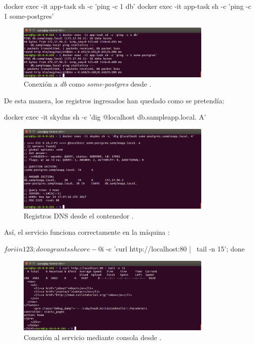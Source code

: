\begin{code}
docker exec -it app-task sh -c 'ping -c 1 db'
docker exec -it app-task sh -c 'ping -c 1 some-postgres'
\end{code}

\begin{figure}[H]
\centering
\includegraphics[width=0.85\textwidth]{images/figures/skydns-ping.png}
\caption{Conexión a \textit{db} como \textit{some-postgres} desde .\label{fig:figure_placement_example}}
\end{figure}

De esta manera, los registros ingresados han quedado como se pretendía:

\begin{code}
docker exec -it skydns sh -c 'dig @localhost db.sampleapp.local. A'
\end{code}

\begin{figure}[H]
\centering
\includegraphics[width=0.85\textwidth]{images/figures/skydns-dig.png}
\caption{Registros DNS desde el contenedor .\label{fig:figure_placement_example}}
\end{figure}

Así, el servicio funciona correctamente en la máquina :
\begin{code}
$ for i in 1 2 3; do vagrant ssh core-0$i -c 'curl http://localhost:80 | \
  tail -n 15'; done
\end{code}

\begin{figure}[H]
\centering
\includegraphics[width=0.85\textwidth]{images/figures/skydns-curl.png}
\caption{Conexión al servicio mediante consola desde \kode{core-01}.\label{fig:figure_placement_example}}
\end{figure}

